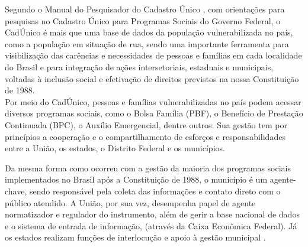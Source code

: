\documentclass[12pt]{article}
\begin{document}
\vspace{0.5cm}

Segundo o Manual do Pesquisador do Cadastro Único \citep{cadunico}, com orientações para pesquisas no Cadastro Único para Programas Sociais do Governo Federal, o CadÚnico é mais que uma base de dados da população vulnerabilizada no país, como a população em situação de rua, sendo uma importante ferramenta para visibilização das carências e necessidades de pessoas e famílias em cada localidade do Brasil e para integração de ações intersetoriais, estaduais e municipais, voltadas à inclusão social e efetivação de direitos previstos na nossa Constituição de 1988.\\

Por meio do CadÚnico, pessoas e famílias vulnerabilizadas no país podem acessar diversos programas sociais, como o Bolsa Família (PBF), o Benefício de Prestação Continuada (BPC), o Auxílio Emergencial, dentre outros. Sua gestão tem por princípios a cooperação e o compartilhamento de esforços e responsabilidades entre a União, os estados, o Distrito Federal e os municípios.

\begin{trivlist}\leftskip=2.5cm
\item Da mesma forma como ocorreu com a gestão da maioria dos programas sociais implementados no Brasil após a Constituição de 1988, o município é um agente-chave, sendo responsável pela coleta das informações e contato direto com o público atendido. A União, por sua vez, desempenha papel de agente normatizador e regulador do instrumento, além de gerir a base nacional de dados e o sistema de entrada de informação, (através da Caixa Econômica Federal). Já os estados realizam funções de interlocução e apoio à gestão municipal \citep[p.~17]{cadunico}.
\end{trivlist}
\end{document}
